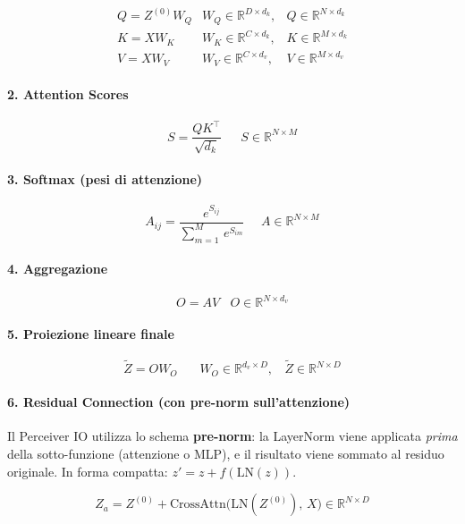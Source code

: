 \documentclass[
  11pt,
]{article}
\begin{document}
\[\begin{matrix}
Q = Z^{(0)}W_{Q} & W_{Q} \in \mathbb{R}^{D \times d_{k}}, & Q \in \mathbb{R}^{N \times d_{k}} \\
K = XW_{K} & W_{K} \in \mathbb{R}^{C \times d_{k}}, & K \in \mathbb{R}^{M \times d_{k}} \\
V = XW_{V} & W_{V} \in \mathbb{R}^{C \times d_{v}}, & V \in \mathbb{R}^{M \times d_{v}}
\end{matrix}\]

\paragraph{2. \textbf{Attention Scores}}

\[S = \frac{QK^{\top}}{\sqrt{d_{k}}}\ \ \ \ \ \ \ S \in \mathbb{R}^{N \times M}\]

\paragraph{3. \textbf{Softmax (pesi di attenzione)}}

\[A_{ij} = \frac{e^{S_{ij}}}{\sum_{m = 1}^{M}\, e^{S_{im}}}\ \ \ \ \ \ A \in \mathbb{R}^{N \times M}\]

\paragraph{4. \textbf{Aggregazione}}

\[O = AV\ \ \ \ O \in \mathbb{R}^{N \times d_{v}}\]

\paragraph{5. \textbf{Proiezione lineare finale}}

\[\widetilde{Z} = OW_{O}\ \ \ \ \ \ \ \ W_{O} \in \mathbb{R}^{d_{v} \times D},\ \ \ \ \widetilde{Z} \in \mathbb{R}^{N \times D}\]

\paragraph{6. \textbf{Residual Connection (con pre-norm sull'attenzione)}}

Il Perceiver IO utilizza lo schema \textbf{pre-norm}: la LayerNorm viene applicata \emph{prima} della sotto-funzione (attenzione o MLP), e il risultato viene sommato al residuo originale.
In forma compatta: $z' = z + f(\mathrm{LN}(z))$.

\[Z_{a} = Z^{(0)} + \text{CrossAttn}\!\bigl(\mathrm{LN}(Z^{(0)}),\, X\bigr) \in \mathbb{R}^{N \times D}\]
\end{document}
